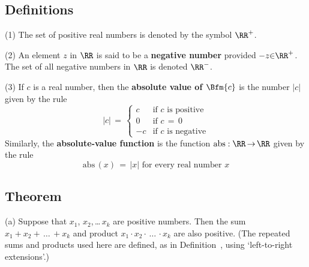

            \subsection{\small{\bf Definitions}}
            \label{DefB20.10}

\V

\hspace*{\parindent}(1) The set of positive real numbers is denoted by the symbol ${\RR}^{+}$.

\V

        (2) An element $z$ in ${\RR}$ is said to be a {\bf negative number} provided $-z{\in}{\RR}^{+}$.
    The set of all negative numbers in ${\RR}$ is denoted ${\RR}^{-}$.

\V

        (3) If $c$ is a real number, then the {\bf absolute value of $\Bfm{c}$}
    is the number $|c|$ given by the rule
        \begin{displaymath}
        |c| \,=\, \left\{
        \begin{array}{rl}
        c & \mbox{if $c$ is positive} \\
        0 & \mbox{if $c \,=\, 0$} \\
       -c & \mbox{if $c$ is negative}
        \end{array}
                                \right.
        \end{displaymath}
    Similarly, the {\bf absolute-value function}
    is the function $\mbox{abs}:{\RR} \,{\rightarrow}\, {\RR}$ given by the rule
        \begin{displaymath}
        \mbox{abs}\,(x) \,=\, |x| \mbox{ for every real number $x$}
        \end{displaymath}


\V
\V

            \subsection{\small{\bf Theorem}}
            \label{ThmB20.20}

\V

\hspace*{\parindent} (a) Suppose that $x_{1}$, $x_{2}$,\,{\ldots}\,$x_{k}$ are positive numbers.
    Then the sum $x_{1} + x_{2} + \,{\ldots}\, + x_{k}$ and product $x_{1}{\cdot}x_{2}{\cdot}\,{\ldots}\,{\cdot}x_{k}$ are also positive.
    (The repeated sums and products used here are defined, as in Definition~, using `left-to-right extensions'.)

